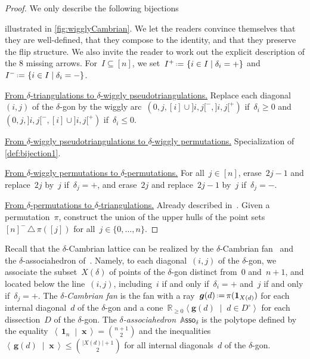 \documentclass{amsart}
\theoremstyle{definition}
\newcommand{\R}{\mathbb{R}} %
\renewcommand{\b}[1]{{\boldsymbol{#1}}} %
\newcommand{\set}[2]{\left\{ #1 \;\middle|\; #2 \right\}} %
\newcommand{\setangle}[2]{\left\langle #1 \;\middle|\; #2 \right\rangle} %
\newcommand{\dotprod}[2]{\left\langle \, #1 \; \middle| \; #2 \, \right\rangle} %
\newcommand{\symdif}{\,\triangle\,} %
\newcommand{\one}{\b{1}} %
\newcommand{\eqdef}{\mbox{\,\raisebox{0.2ex}{\scriptsize\ensuremath{\mathrm:}}\ensuremath{=}\,}} %
\newcommand{\darkblue}{\color{darkblue}} %
\newcommand{\defn}[1]{\textsl{\darkblue #1}} %
\newcommand{\para}[1]{\smallskip\noindent\uline{#1.}} %
\newcommand{\polytope}[1]{\mathds{#1}} %
\newcommand{\Asso}{\polytope{A}\mathsf{sso}} %
\begin{document}
\begin{proof}
We only describe the following bijections
\begin{center}
\end{center}
illustrated in \cref{fig:wigglyCambrian}.
We let the readers convince themselves that they are well-defined, that they compose to the identity, and that they preserve the flip structure. We also invite the reader to work out the explicit description of the 8 missing arrows.
For~$I \subseteq [n]$, we set~$I^+ \eqdef \set{i \in I}{\delta_i = {+}}$ and~$I^- \eqdef \set{i \in I}{\delta_i = {-}}$.

\para{From $\delta$-triangulations to $\delta$-wiggly pseudotriangulations}
Replace each diagonal~$(i,j)$ of the $\delta$-gon by the wiggly arc~$(0, j, [i] \cup {]i,j[}^-, {]i,j[}^+)$ if~$\delta_i \ge 0$ and~$(0, j, {]i,j[}^-, [i] \cup {]i,j[}^+)$ if~$\delta_i \le 0$.

\para{From $\delta$-wiggly pseudotriangulations to $\delta$-wiggly permutations}
Specialization of \cref{def:bijection1}.

\para{From $\delta$-wiggly permutations to $\delta$-permutations}
For all~$j \in [n]$, erase~$2j-1$ and replace~$2j$ by~$j$ if~$\delta_j = {+}$, and erase~$2j$ and replace~$2j-1$ by~$j$ if~$\delta_j = {-}$.

\para{From $\delta$-permutations to $\delta$-triangulations}
Already described in~\cite{Reading-CambrianLattices}.
Given a permutation~$\pi$, construct the union of the upper hulls of the point sets~$[n]^- \symdif \pi([j])$ for all~$j \in \{0, \dots, n\}$.
\end{proof}

Recall that the $\delta$-Cambrian lattice can be realized by the $\delta$-Cambrian fan~\cite{ReadingSpeyer} and the $\delta$-associahedron of~\cite{HohlwegLange}.
Namely, to each diagonal~$(i,j)$ of the $\delta$-gon, we associate the subset~$X(\delta)$ of points of the $\delta$-gon distinct from~$0$ and~$n+1$, and located below the line~$(i,j)$, including~$i$ if and only if~$\delta_i = {+}$ and~$j$ if and only if~$\delta_j = {+}$.
The \defn{$\delta$-Cambrian fan} is the fan with a ray~$\b{g}(d) \eqdef \pi(\one_{X(d)})$ for each internal diagonal~$d$ of the $\delta$-gon and a cone~$\R_{\ge0} \setangle{\b{g}(d)}{d \in D^\circ}$ for each dissection~$D$ of the $\delta$-gon.
The \defn{$\delta$-associahedron}~$\Asso_\delta$ is the polytope defined by the equality~$\dotprod{\one_n}{\b{x}} = \binom{n+1}{2}$ and the inequalities~$\dotprod{\b{g}(d)}{\b{x}} \le \binom{|X(d)|+1}{2}$ for all internal diagonals~$d$ of the $\delta$-gon.
\end{document}
